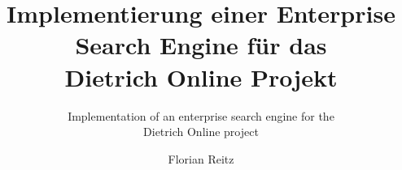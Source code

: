 \documentclass[envcountsame,envcountchap, deutsch]{i-studis}
\begin{document}
\title{Implementierung einer Enterprise Search Engine für das \\ Dietrich Online Projekt}
\subtitle{ Implementation of an enterprise search engine for the \\ Dietrich Online project }
\author{ Florian Reitz } 							%
\address{Trier, den 15.10.2019} 							%
\begingroup
  \renewcommand{\thepage}{Titel}
  \mytitlepage
  \newpage
\endgroup
\frontmatter 
\tableofcontents 						%
\listoffigures 							%
\listoftables 							%
\mainmatter                        		%






\backmatter                        		%
\printindex 							%
\begin{appendix}						%
\end{appendix}
\end{document}
